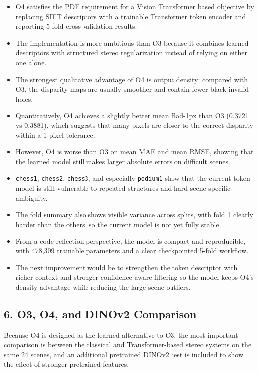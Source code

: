 \documentclass[
  11pt,
]{article}
\providecommand{\tightlist}{%
  \setlength{\itemsep}{0pt}\setlength{\parskip}{0pt}}
\begin{document}
\begin{itemize}
\tightlist
\item
  O4 satisfies the PDF requirement for a Vision Transformer based
  objective by replacing SIFT descriptors with a trainable Transformer
  token encoder and reporting 5-fold cross-validation results.
\item
  The implementation is more ambitious than O3 because it combines
  learned descriptors with structured stereo regularization instead of
  relying on either one alone.
\item
  The strongest qualitative advantage of O4 is output density: compared
  with O3, the disparity maps are usually smoother and contain fewer
  black invalid holes.
\item
  Quantitatively, O4 achieves a slightly better mean Bad-1px than O3
  (0.3721 vs 0.3881), which suggests that many pixels are closer to the
  correct disparity within a 1-pixel tolerance.
\item
  However, O4 is worse than O3 on mean MAE and mean RMSE, showing that
  the learned model still makes larger absolute errors on difficult
  scenes.
\item
  \texttt{chess1}, \texttt{chess2}, \texttt{chess3}, and especially
  \texttt{podium1} show that the current token model is still vulnerable
  to repeated structures and hard scene-specific ambiguity.
\item
  The fold summary also shows visible variance across splits, with fold
  1 clearly harder than the others, so the current model is not yet
  fully stable.
\item
  From a code reflection perspective, the model is compact and
  reproducible, with 478,309 trainable parameters and a clear
  checkpointed 5-fold workflow.
\item
  The next improvement would be to strengthen the token descriptor with
  richer context and stronger confidence-aware filtering so the model
  keeps O4's density advantage while reducing the large-scene outliers.
\end{itemize}

\subsection{6. O3, O4, and DINOv2 Comparison}\label{o3-and-o4-comparison}

Because O4 is designed as the learned alternative to O3, the most
important comparison is between the classical and Transformer-based
stereo systems on the same 24 scenes, and an additional pretrained
DINOv2 test is included to show the effect of stronger pretrained
features.
\end{document}
